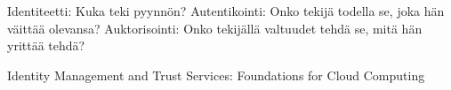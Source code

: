 \documentclass[finnish,gradu]{tktltiki}
\begin{document}
  Identiteetti: Kuka teki pyynnön?
  Autentikointi: Onko tekijä todella se, joka hän väittää olevansa?
  Auktorisointi: Onko tekijällä valtuudet tehdä se, mitä hän yrittää tehdä?

  Identity Management and Trust Services: Foundations for Cloud Computing

\end{document}
